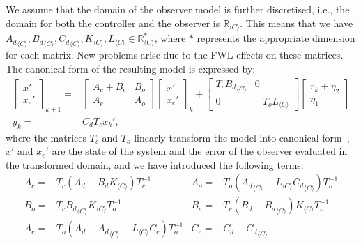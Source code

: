 \documentclass[sigconf]{llncs}
\newcommand{\mat}[1]{{#1}}
\renewcommand{\vec}[1]{{#1}}
\begin{document}
We assume that the domain of the observer model is further discretised, 
i.e., the domain for both the controller and the observer is $\mathbb{R}_{\langle C \rangle}$.
This means that we have 
${\mat{A}_d}_{\langle C
\rangle},{\mat{B}_d}_{\langle C \rangle},{\mat{C}_d}_{\langle C \rangle},
\mat{K}_{\langle C \rangle}, \mat{L}_{\langle C \rangle} \in
\mathbb{R}_{\langle C \rangle}^*$, where $*$ represents the appropriate
dimension for each matrix.
New problems arise due to the FWL effects on these matrices.  
The canonical form of the resulting model is expressed by:
%
\begin{align}
\left [\begin{array}{c}\vec{x}'\\ \vec{x}_e' \end{array}\right]_{k+1}
=& \left [\begin{array}{cc}\mat{A}_{c}+\mat{B}_{e}&\mat{B}_{o}\\ \mat{A}_{e}&\mat{A}_{o}\end{array}\right]
\left [\begin{array}{c}\vec{x}'\\ \vec{x}_e' \end{array}\right]_k
+\left[\begin{array}{cc}\mat{T}_c{\mat{B}_d}_{\langle C \rangle}&\mat{0}\\\mat{0}&-\mat{T}_o\mat{L}_{\langle C \rangle}\end{array}\right]\left [\begin{array}{c} \vec{r}_k + \vec{\eta}_2\\ \vec{\eta}_1\end{array}\right]\nonumber\\
\vec{y}_k= &\mat{C}_d\mat{T}_c\vec{x}_k', 
\label{eq:observer_LTI_FWL_cf}
\end{align}
where the matrices $\mat{T}_c$ and $\mat{T}_o$ linearly transform the model into canonical form~\cite{Astrom08}, $\vec{x}'$ and $\vec{x}_e'$ are the state of the system and the error of the observer evaluated in the transformed domain, 
and we have introduced the following terms: 
{\setlength{\abovedisplayskip}{2pt}
\setlength{\belowdisplayskip}{2pt}
\begin{align*}
\mat{A}_{c}=&\mat{T}_c\left(\mat{A}_d-\mat{B}_d\mat{K}_{\langle C \rangle}\right)\mat{T}_c^{-1}&
\mat{A}_{o}=&\mat{T}_o\left({\mat{A}_d}_{\langle C \rangle}-\mat{L}_{\langle C \rangle}{\mat{C}_d}_{\langle C \rangle}\right)\mat{T}_o^{-1}\\
\mat{B}_{o}=&\mat{T}_c{\mat{B}_d}_{\langle C \rangle}\mat{K}_{\langle C \rangle}\mat{T}_o^{-1}&
\mat{B}_{e}=&\mat{T}_c(\mat{B}_d-{\mat{B}_d}_{\langle C \rangle})\mat{K}_{\langle C \rangle}\mat{T}_o^{-1}\\
\mat{A}_{e}=&\mat{T}_o\left(\mat{A}_d-{\mat{A}_d}_{\langle C \rangle}-\mat{L}_{\langle C \rangle}\mat{C}_e\right)\mat{T}_o^{-1}&
\mat{C}_{e}=&\mat{C}_d-{\mat{C}_d}_{\langle C \rangle}
\end{align*}
}
\end{document}
